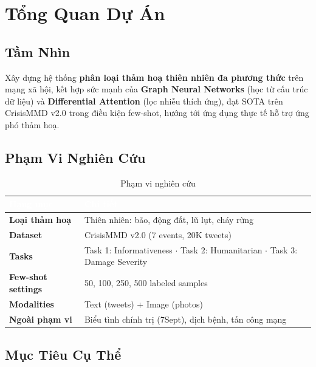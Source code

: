 \documentclass[12pt,a4paper]{article}
\begin{document}
\section{Tổng Quan Dự Án}

\subsection{Tầm Nhìn}

\begin{goalbox}
Xây dựng hệ thống \textbf{phân loại thảm hoạ thiên nhiên đa phương thức} trên mạng xã hội, kết hợp sức mạnh của \textbf{Graph Neural Networks} (học từ cấu trúc dữ liệu) và \textbf{Differential Attention} (lọc nhiễu thích ứng), đạt SOTA trên CrisisMMD v2.0 trong điều kiện few-shot, hướng tới ứng dụng thực tế hỗ trợ ứng phó thảm hoạ.
\end{goalbox}

\subsection{Phạm Vi Nghiên Cứu}

\begin{table}[H]
\centering
\caption{Phạm vi nghiên cứu}
\begin{tabularx}{\textwidth}{>{\bfseries}l X}
\toprule
\rowcolor{tableheader}
\textcolor{white}{\textbf{Hạng mục}} & \textcolor{white}{\textbf{Chi tiết}} \\
\midrule
Loại thảm hoạ & Thiên nhiên: bão, động đất, lũ lụt, cháy rừng \\
Dataset & CrisisMMD v2.0 (7 events, 20K tweets) \\
Tasks & Task 1: Informativeness $\cdot$ Task 2: Humanitarian $\cdot$ Task 3: Damage Severity \\
Few-shot settings & 50, 100, 250, 500 labeled samples \\
Modalities & Text (tweets) + Image (photos) \\
Ngoài phạm vi & Biểu tình chính trị (7Sept), dịch bệnh, tấn công mạng \\
\bottomrule
\end{tabularx}
\end{table}

\subsection{Mục Tiêu Cụ Thể}
\end{document}
